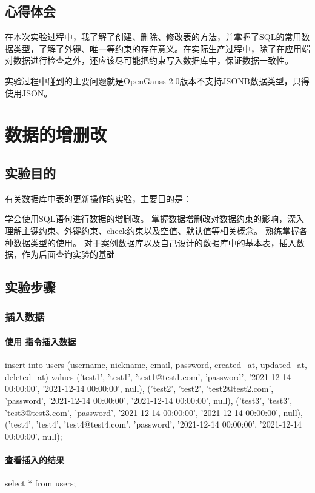 \documentclass{ctexrep}
\begin{document}
\section{心得体会}
在本次实验过程中，我了解了创建、删除、修改表的方法，并掌握了SQL的常用数据类型，了解了外键、唯一等约束的存在意义。在实际生产过程中，除了在应用端对数据进行检查之外，还应该尽可能把约束写入数据库中，保证数据一致性。

实验过程中碰到的主要问题就是OpenGauss 2.0版本不支持JSONB数据类型，只得使用JSON。

\chapter{数据的增删改}
\section{实验目的}
有关数据库中表的更新操作的实验，主要目的是：
\begin{outline}[enumerate]
    \1 学会使用SQL语句进行数据的增删改。
    \1 掌握数据增删改对数据约束的影响，深入理解主键约束、外键约束、check约束以及空值、默认值等相关概念。
    \1 熟练掌握各种数据类型的使用。
    \1 对于案例数据库以及自己设计的数据库中的基本表，插入数据，作为后面查询实验的基础
\end{outline}

\section{实验步骤}
\subsection{插入数据}
\subsubsection{使用  指令插入数据}
\begin{run}
    insert into users (username, nickname, email, password, created_at, updated_at, deleted_at) values 
    ('test1', 'test1', 'test1@test1.com', 'password', '2021-12-14 00:00:00', '2021-12-14 00:00:00', null),
    ('test2', 'test2', 'test2@test2.com', 'password', '2021-12-14 00:00:00', '2021-12-14 00:00:00', null),
    ('test3', 'test3', 'test3@test3.com', 'password', '2021-12-14 00:00:00', '2021-12-14 00:00:00', null),
    ('test4', 'test4', 'test4@test4.com', 'password', '2021-12-14 00:00:00', '2021-12-14 00:00:00', null);
\end{run}
\subsubsection{查看插入的结果}
\begin{run}
    select * from users;
\end{run}
\end{document}
